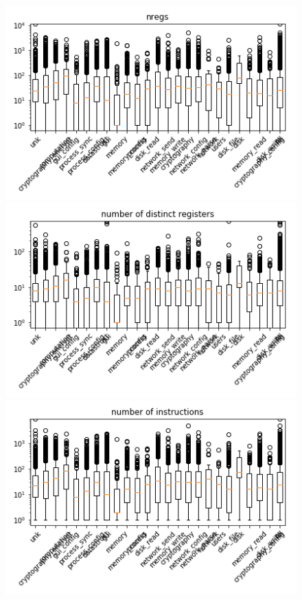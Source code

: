 \begin{appendices}
\begin{figure}[H]
%
\centering
\includegraphics[width=0.9\linewidth]{img/boxplots/v3_unbalanced_nregs.png}
\endminipage
{}%
\centering
\includegraphics[width=0.9\linewidth]{img/boxplots/v3_unbalanced_number_of_distinct_registers.png}
\endminipage
{}%
\centering
\includegraphics[width=0.9\linewidth]{img/boxplots/v3_unbalanced_number_of_instructions.png}
\endminipage



\end{figure}
\end{appendices}
